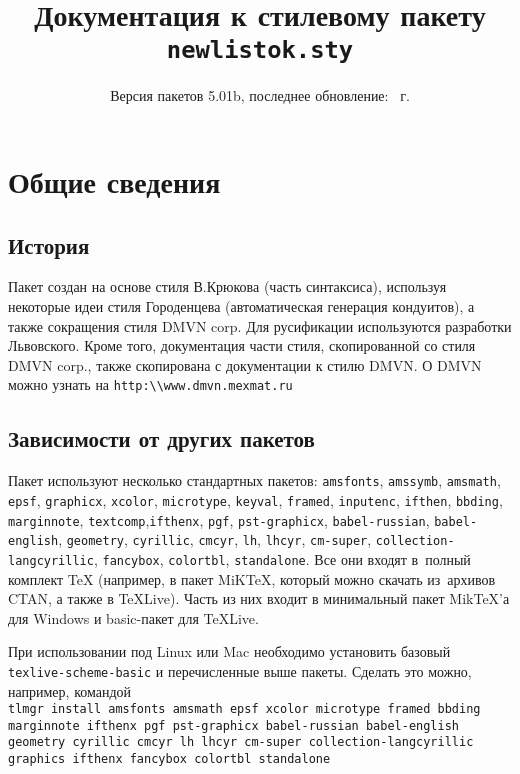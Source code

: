 \documentclass[10pt]{article}
\title{Документация к стилевому пакету \texttt{newlistok.sty}}
\date{Версия пакетов 5.01b, последнее обновление: \сегодня~г.}
\begin{document}
\maketitle


\tableofcontents
\pagebreak





\section{Общие сведения}

\subsection{История}
Пакет создан на основе стиля В.Крюкова (часть синтаксиса), используя некоторые идеи стиля Городенцева
(автоматическая генерация кондуитов), а также сокращения стиля DMVN corp. Для русификации используются разработки Львовского. Кроме того, документация части стиля, скопированной со стиля DMVN corp., также скопирована с документации к стилю DMVN. О DMVN можно узнать на \verb'http:\\www.dmvn.mexmat.ru'

\subsection{Зависимости от других пакетов}

Пакет используют несколько стандартных пакетов: \texttt{amsfonts}, \texttt{amssymb}, \texttt{amsmath}, \texttt{epsf}, \texttt{graphicx}, \texttt{xcolor}, \texttt{microtype}, \texttt{keyval}, \texttt{framed}, \texttt{inputenc}, \texttt{ifthen}, \texttt{bbding}, \texttt{marginnote}, \texttt{textcomp},\texttt{ifthenx}, \texttt{pgf}, \texttt{pst-graphicx}, \texttt{babel-russian}, \texttt{babel-english}, \texttt{geometry}, \texttt{cyrillic}, \texttt{cmcyr}, \texttt{lh}, \texttt{lhcyr}, \texttt{cm-super}, \texttt{collection-langcyrillic}, \texttt{fancybox}, \texttt{colortbl}, \texttt{standalone}. Все они входят в~полный комплект \TeX{} (например, в пакет
MiK\TeX, который можно скачать из~архивов CTAN, а также в \TeX Live).
Часть из них входит в минимальный пакет MikTeX'а для Windows и basic-пакет для \TeX Live.

При использовании под Linux или Mac необходимо установить базовый \texttt{texlive-scheme-basic} и перечисленные выше пакеты.
Сделать это можно, например, командой
\\\texttt{tlmgr install amsfonts amsmath epsf xcolor microtype framed bbding marginnote ifthenx pgf pst-graphicx babel-russian babel-english geometry cyrillic cmcyr lh lhcyr cm-super collection-langcyrillic graphics ifthenx fancybox colortbl standalone}
\end{document}
